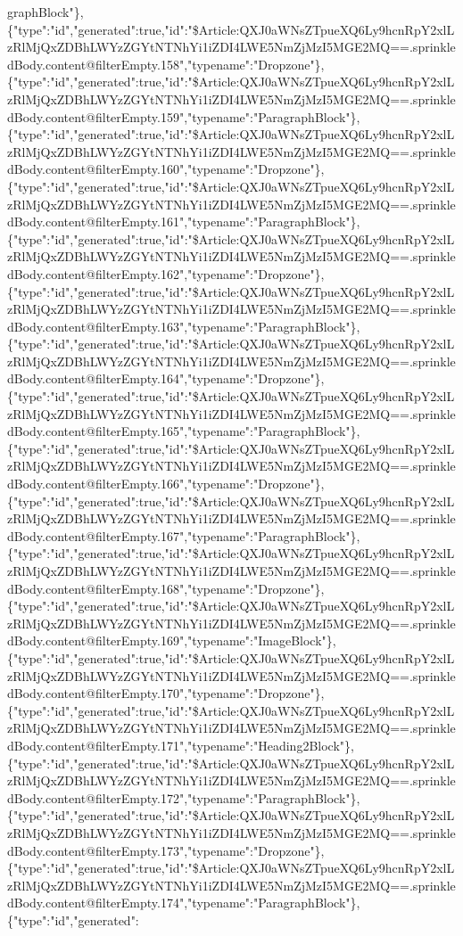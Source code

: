 graphBlock"\},\{"type":"id","generated":true,"id":"\$Article:QXJ0aWNsZTpueXQ6Ly9hcnRpY2xlLzRlMjQxZDBhLWYzZGYtNTNhYi1iZDI4LWE5NmZjMzI5MGE2MQ==.sprinkledBody.content@filterEmpty.158","typename":"Dropzone"\},\{"type":"id","generated":true,"id":"\$Article:QXJ0aWNsZTpueXQ6Ly9hcnRpY2xlLzRlMjQxZDBhLWYzZGYtNTNhYi1iZDI4LWE5NmZjMzI5MGE2MQ==.sprinkledBody.content@filterEmpty.159","typename":"ParagraphBlock"\},\{"type":"id","generated":true,"id":"\$Article:QXJ0aWNsZTpueXQ6Ly9hcnRpY2xlLzRlMjQxZDBhLWYzZGYtNTNhYi1iZDI4LWE5NmZjMzI5MGE2MQ==.sprinkledBody.content@filterEmpty.160","typename":"Dropzone"\},\{"type":"id","generated":true,"id":"\$Article:QXJ0aWNsZTpueXQ6Ly9hcnRpY2xlLzRlMjQxZDBhLWYzZGYtNTNhYi1iZDI4LWE5NmZjMzI5MGE2MQ==.sprinkledBody.content@filterEmpty.161","typename":"ParagraphBlock"\},\{"type":"id","generated":true,"id":"\$Article:QXJ0aWNsZTpueXQ6Ly9hcnRpY2xlLzRlMjQxZDBhLWYzZGYtNTNhYi1iZDI4LWE5NmZjMzI5MGE2MQ==.sprinkledBody.content@filterEmpty.162","typename":"Dropzone"\},\{"type":"id","generated":true,"id":"\$Article:QXJ0aWNsZTpueXQ6Ly9hcnRpY2xlLzRlMjQxZDBhLWYzZGYtNTNhYi1iZDI4LWE5NmZjMzI5MGE2MQ==.sprinkledBody.content@filterEmpty.163","typename":"ParagraphBlock"\},\{"type":"id","generated":true,"id":"\$Article:QXJ0aWNsZTpueXQ6Ly9hcnRpY2xlLzRlMjQxZDBhLWYzZGYtNTNhYi1iZDI4LWE5NmZjMzI5MGE2MQ==.sprinkledBody.content@filterEmpty.164","typename":"Dropzone"\},\{"type":"id","generated":true,"id":"\$Article:QXJ0aWNsZTpueXQ6Ly9hcnRpY2xlLzRlMjQxZDBhLWYzZGYtNTNhYi1iZDI4LWE5NmZjMzI5MGE2MQ==.sprinkledBody.content@filterEmpty.165","typename":"ParagraphBlock"\},\{"type":"id","generated":true,"id":"\$Article:QXJ0aWNsZTpueXQ6Ly9hcnRpY2xlLzRlMjQxZDBhLWYzZGYtNTNhYi1iZDI4LWE5NmZjMzI5MGE2MQ==.sprinkledBody.content@filterEmpty.166","typename":"Dropzone"\},\{"type":"id","generated":true,"id":"\$Article:QXJ0aWNsZTpueXQ6Ly9hcnRpY2xlLzRlMjQxZDBhLWYzZGYtNTNhYi1iZDI4LWE5NmZjMzI5MGE2MQ==.sprinkledBody.content@filterEmpty.167","typename":"ParagraphBlock"\},\{"type":"id","generated":true,"id":"\$Article:QXJ0aWNsZTpueXQ6Ly9hcnRpY2xlLzRlMjQxZDBhLWYzZGYtNTNhYi1iZDI4LWE5NmZjMzI5MGE2MQ==.sprinkledBody.content@filterEmpty.168","typename":"Dropzone"\},\{"type":"id","generated":true,"id":"\$Article:QXJ0aWNsZTpueXQ6Ly9hcnRpY2xlLzRlMjQxZDBhLWYzZGYtNTNhYi1iZDI4LWE5NmZjMzI5MGE2MQ==.sprinkledBody.content@filterEmpty.169","typename":"ImageBlock"\},\{"type":"id","generated":true,"id":"\$Article:QXJ0aWNsZTpueXQ6Ly9hcnRpY2xlLzRlMjQxZDBhLWYzZGYtNTNhYi1iZDI4LWE5NmZjMzI5MGE2MQ==.sprinkledBody.content@filterEmpty.170","typename":"Dropzone"\},\{"type":"id","generated":true,"id":"\$Article:QXJ0aWNsZTpueXQ6Ly9hcnRpY2xlLzRlMjQxZDBhLWYzZGYtNTNhYi1iZDI4LWE5NmZjMzI5MGE2MQ==.sprinkledBody.content@filterEmpty.171","typename":"Heading2Block"\},\{"type":"id","generated":true,"id":"\$Article:QXJ0aWNsZTpueXQ6Ly9hcnRpY2xlLzRlMjQxZDBhLWYzZGYtNTNhYi1iZDI4LWE5NmZjMzI5MGE2MQ==.sprinkledBody.content@filterEmpty.172","typename":"ParagraphBlock"\},\{"type":"id","generated":true,"id":"\$Article:QXJ0aWNsZTpueXQ6Ly9hcnRpY2xlLzRlMjQxZDBhLWYzZGYtNTNhYi1iZDI4LWE5NmZjMzI5MGE2MQ==.sprinkledBody.content@filterEmpty.173","typename":"Dropzone"\},\{"type":"id","generated":true,"id":"\$Article:QXJ0aWNsZTpueXQ6Ly9hcnRpY2xlLzRlMjQxZDBhLWYzZGYtNTNhYi1iZDI4LWE5NmZjMzI5MGE2MQ==.sprinkledBody.content@filterEmpty.174","typename":"ParagraphBlock"\},\{"type":"id","generated":